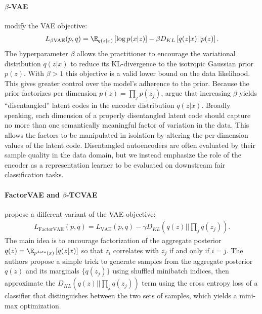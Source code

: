 \paragraph{$\beta$-VAE}
\citet{higgins2016beta} modify the VAE objective:
\begin{align}
    L_{\beta\text{VAE}}(p,q) = \E_{q(z|x)} \left[ \log p(x|z) \right] - \beta D_{KL} \left[ q(z|x) || p(z) \right ]. \nonumber
\end{align}
The hyperparameter $\beta$ allows the practitioner to encourage the variational distribution $q(z|x)$ to reduce its KL-divergence to the isotropic Gaussian prior $p(z)$.
With $\beta>1$ this objective is a valid lower bound on the data likelihood. 
This gives greater control over the model's adherence to the prior.
Because the prior factorizes per dimension $p(z) = \prod_j p(z_j)$, \citet{higgins2016beta} argue that increasing $\beta$ yields ``disentangled'' latent codes in the encoder distribution $q(z|x)$.
Broadly speaking, each dimension of a properly disentangled latent code should capture no more than one semantically meaningful factor of variation in the data.
This allows the factors to be manipulated in isolation by altering the per-dimension values of the latent code.
Disentangled autoencoders are often evaluated by their sample quality in the data domain, but we instead emphasize the role of the encoder as a representation learner to be evaluated on downstream fair classification tasks.

\paragraph{FactorVAE and $\beta$-TCVAE}
\citet{kim2018disentangling} propose a different variant of the VAE objective:
\begin{align}%
    L_{\text{FactorVAE}}(p,q) = L_{\text{VAE}}(p,q) - \gamma D_{KL}(q(z)||\prod_{j} q(z_j)). \nonumber
\end{align}
The main idea is to encourage factorization of the aggregate posterior $q(z)=\E_{p^{\text{data}}(x)} \left[ q(z|x) \right]$ so that $z_i$ correlates with $z_j$ if and only if $i=j$.
The authors propose a simple trick to generate samples from the aggregate posterior $q(z)$ and its marginals $\{q(z_j)\}$ using shuffled minibatch indices, then approximate the $D_{KL}(q(z)||\prod_{j} q(z_j))$ term using the cross entropy loss of a classifier that distinguishes between the two sets of samples, which yields a mini-max optimization.

